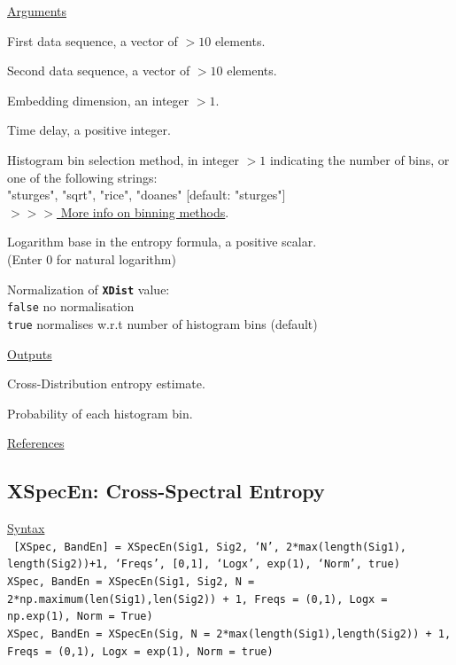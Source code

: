 \documentclass[12pt, a4paper, titlepage, openany]{book}
\begin{document}
\noindent \ul{Arguments}
\begin{description}[labelsep=1cm, labelwidth=2cm, nosep, style=multiline,leftmargin=3cm]\footnotesize
\item[\texttt{Sig1}]	First data sequence, a vector of $>10$ elements.
\item[\texttt{Sig2}]	Second data sequence, a vector of $>10$ elements.
\item[\texttt{m}]		Embedding dimension, an integer $> 1$.
\item[\texttt{tau}]		Time delay, a positive integer.
\item[\texttt{Bins}]	Histogram bin selection method, in integer $> 1$ indicating the number of bins, 
						or one of the following strings:\\
   					    "sturges", "sqrt", "rice", "doanes" \hspace{2em} [default: "sturges"]
\\ \href{https://en.wikipedia.org/wiki/Histogram#Number_of_bins_and_width}{$>>>$ More info on binning methods}.
\item[\texttt{Logx}]	Logarithm base in the entropy formula, a positive scalar.\\
						(Enter 0 for natural logarithm)
\item[\texttt{Norm}]	Normalization of \texttt{\textbf{XDist}} value:\\
		  \texttt{false} \hspace{10pt} no normalisation \\
		  \texttt{true} \hspace{15pt} normalises w.r.t number of histogram bins (default)
\end{description}

\noindent \ul{Outputs}
\begin{description}[labelsep=1cm, labelwidth=2cm, nosep, style=multiline,leftmargin=3cm]\footnotesize
\item[\texttt{XDist}]		Cross-Distribution entropy estimate.
\item[\texttt{Ppi}]		Probability of each histogram bin.
\end{description}

\noindent \ul{References}\hspace{1cm}
\cite{Dist1}



\newpage
\subsection{\normalsize XSpecEn: \hspace{15mm} Cross-Spectral Entropy}
\noindent\ul{Syntax} \vspace{6mm} \\ \noindent \texttt{\footnotesize
[XSpec, BandEn] = XSpecEn(Sig1, Sig2, ‘N’, 2*max(length(Sig1), length(Sig2))+1, ‘Freqs’, [0,1], ‘Logx’, exp(1), ‘Norm’, true)\\
XSpec, BandEn  = XSpecEn(Sig1, Sig2, N = 2*np.maximum(len(Sig1),len(Sig2)) + 1, Freqs = (0,1), Logx = np.exp(1), Norm = True)\\ 
XSpec, BandEn  = XSpecEn(Sig, N = 2*max(length(Sig1),length(Sig2)) + 1, Freqs = (0,1), Logx = exp(1), Norm = true)}
\end{document}
